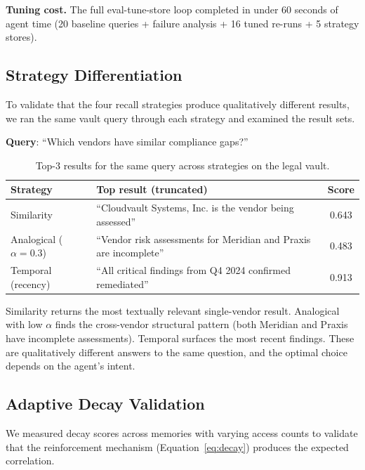 \documentclass{article}
\begin{document}
\textbf{Tuning cost.} The full eval-tune-store loop completed in under 60 seconds of agent time (20 baseline queries + failure analysis + 16 tuned re-runs + 5 strategy stores).

\subsection{Strategy Differentiation}
\label{sec:exp_strategies}

To validate that the four recall strategies produce qualitatively different results, we ran the same vault query through each strategy and examined the result sets.

\textbf{Query}: ``Which vendors have similar compliance gaps?''

\begin{table}[h]
\centering
\caption{Top-3 results for the same query across strategies on the legal vault.}
\label{tab:strategies}
\small
\begin{tabular}{@{}lp{7.5cm}c@{}}
\toprule
\textbf{Strategy} & \textbf{Top result (truncated)} & \textbf{Score} \\
\midrule
Similarity & ``Cloudvault Systems, Inc. is the vendor being assessed'' & 0.643 \\
Analogical ($\alpha{=}0.3$) & ``Vendor risk assessments for Meridian and Praxis are incomplete'' & 0.483 \\
Temporal (recency) & ``All critical findings from Q4 2024 confirmed remediated'' & 0.913 \\
\bottomrule
\end{tabular}
\end{table}

Similarity returns the most textually relevant single-vendor result. Analogical with low $\alpha$ finds the cross-vendor structural pattern (both Meridian and Praxis have incomplete assessments). Temporal surfaces the most recent findings. These are qualitatively different answers to the same question, and the optimal choice depends on the agent's intent.

\subsection{Adaptive Decay Validation}
\label{sec:exp_decay}

We measured decay scores across memories with varying access counts to validate that the reinforcement mechanism (Equation~\ref{eq:decay}) produces the expected correlation.
\end{document}
